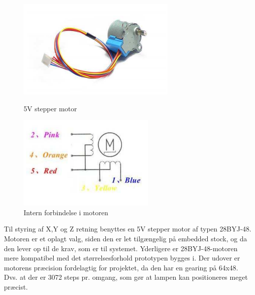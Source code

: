 \begin{figure}[H]
\centering
\begin{minipage}{.5\textwidth}
  \centering
  \includegraphics[width=\linewidth]{0_Filer/Figuer/5_HW_Design/Stepper_motor.png}
  \caption{5V stepper motor}
  \label{fig:HWD_Stepper_Motor}
\end{minipage}%
\begin{minipage}{.5\textwidth}
  \centering
  \includegraphics[width=\linewidth]{0_Filer/Figuer/5_HW_Design/Motor_diagram.png}
  \caption{Intern forbindelse i motoren}
  \label{fig:HWD_Stepper_Diagram}
\end{minipage}
\end{figure}

Til styring af X,Y og Z retning benyttes en 5V stepper motor af typen 28BYJ-48. Motoren er et oplagt valg, siden den er let tilgængelig på embedded stock, og da den lever op til de krav, som er til systemet. Yderligere er 28BYJ-48-motoren mere kompatibel med det størrelsesforhold prototypen bygges i. Der udover er motorens præcision fordelagtig for projektet, da den har en gearing på 64x48. Dvs. at der er 3072 steps pr. omgang, som gør at lampen kan positioneres meget præcist.


